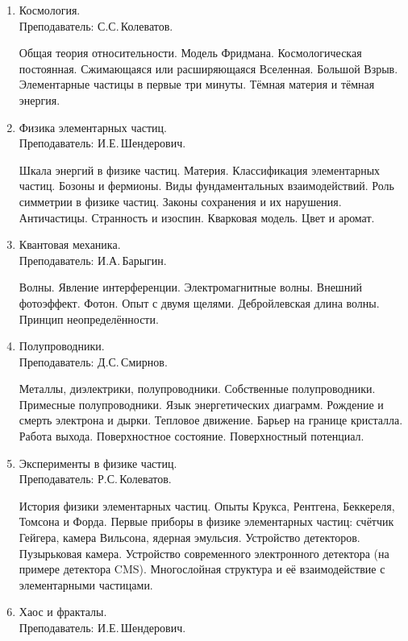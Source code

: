 \documentclass[12pt,a4paper,oneside,draft]{scrartcl}
\newlength{\h}
\newlength{\x}
\begin{document}
\begin{enumerate}
\item Космология. \\ \textsf{Преподаватель: С.С.\,Колеватов.}

  Общая теория относительности. Модель Фридмана. Космологическая
  постоянная. Сжимающаяся или расширяющаяся Вселенная. Большой
  Взрыв. Элементарные частицы в первые три минуты. Тёмная материя и
  тёмная энергия.

\item Физика элементарных частиц. \\ \textsf{Преподаватель: И.Е.\,Шендерович}.

  Шкала энергий в физике частиц. Материя. Классификация элементарных
  частиц. Бозоны и фермионы. Виды фундаментальных взаимодействий. Роль
  симметрии в физике частиц. Законы сохранения и их
  нарушения. Античастицы. Странность и изоспин. Кварковая модель. Цвет
  и аромат.

\item Квантовая механика. \\ \textsf{Преподаватель: И.А.\,Барыгин}.

  Волны. Явление интерференции. Электромагнитные волны. Внешний
  фотоэффект. Фотон. Опыт с двумя щелями. Дебройлевская длина
  волны. Принцип неопределённости.

\item Полупроводники.  \\ \textsf{Преподаватель: Д.С.\,Смирнов}.

  Металлы, диэлектрики, полупроводники. Собственные
  полупроводники. Примесные полупроводники. Язык энергетических
  диаграмм. Рождение и смерть электрона и дырки. Тепловое
  движение. Барьер на границе кристалла. Работа выхода. Поверхностное
  состояние. Поверхностный потенциал.

\item Эксперименты в физике частиц.  \\ \textsf{Преподаватель:
    Р.С.\,Колеватов}.

  История физики элементарных частиц. Опыты Крукса, Рентгена,
  Беккереля, Томсона и Форда. Первые приборы в физике элементарных
  частиц: счётчик Гейгера, камера Вильсона, ядерная
  эмульсия. Устройство детекторов. Пузырьковая камера. Устройство
  современного электронного детектора (на примере детектора
  CMS). Многослойная структура и её взаимодействие с элементарными
  частицами. 

\item Хаос и фракталы.\\ \textsf{Преподаватель: И.Е.\,Шендерович}.


\end{enumerate}
\end{document}
